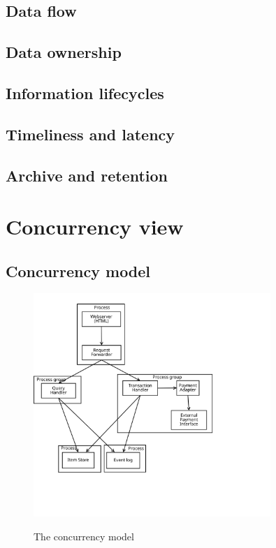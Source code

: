 \subsection{Data flow}
\label{sec:data-flow}


\subsection{Data ownership}
\label{sec:data-ownership}


\subsection{Information lifecycles}
\label{sec:inform-lifecycl}


\subsection{Timeliness and latency}
\label{sec:timeliness-latency}


\subsection{Archive and retention}
\label{sec:archive-retention}


\newpage
\section{Concurrency view}
\label{sec:concurrency-view}


\subsection{Concurrency model}
\label{sec:concurrency-model}

\begin{figure}[h!]
    \centering
    \caption{The concurrency model}
    \includegraphics[width=0.8\textwidth]{figures/concurrency-model}
    \label{fig:concurrency-model}
\end{figure}

